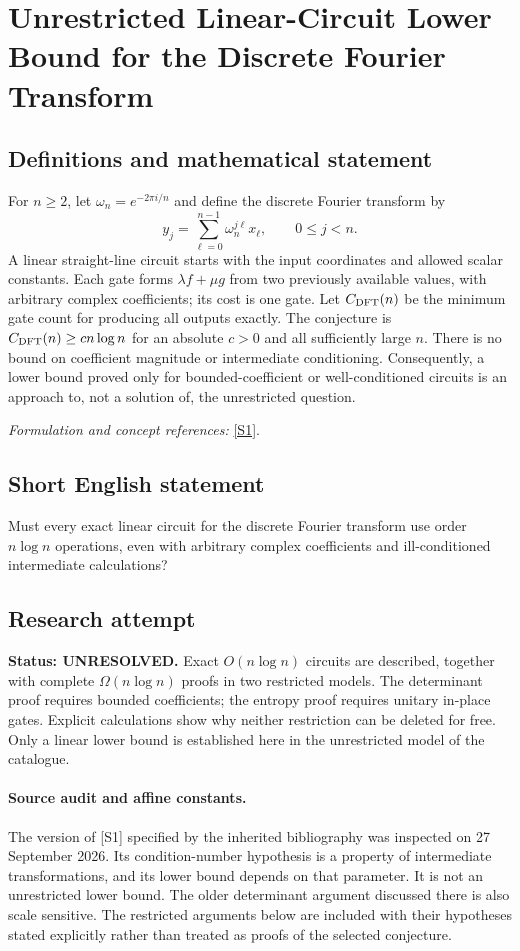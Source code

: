 \documentclass[11pt]{article}
\begin{document}
\section*{\texorpdfstring{Unrestricted Linear-Circuit Lower Bound for the Discrete Fourier Transform}{Unrestricted Linear-Circuit Lower Bound for the Discrete Fourier Transform}}\label{30006850}
\subsection{Definitions and mathematical statement}
For $n\ge2$, let $\omega_n=e^{-2\pi i/n}$ and define the discrete Fourier transform by
\[
 y_j=\sum_{\ell=0}^{n-1}\omega_n^{j\ell}x_\ell,
 \qquad0\le j<n.
\]
A linear straight-line circuit starts with the input coordinates and allowed scalar constants. Each gate forms $\lambda f+\mu g$ from two previously available values, with arbitrary complex coefficients; its cost is one gate. Let $C_{\rm DFT}(n)$ be the minimum gate count for producing all outputs exactly. The conjecture is $C_{\rm DFT}(n)\ge c n\log n$ for an absolute $c>0$ and all sufficiently large $n$. There is no bound on coefficient magnitude or intermediate conditioning. Consequently, a lower bound proved only for bounded-coefficient or well-conditioned circuits is an approach to, not a solution of, the unrestricted question.
\par\smallskip\textit{Formulation and concept references:} \href{https://arxiv.org/pdf/1403.1307v5}{[S1]}.

\subsection{Short English statement}
Must every exact linear circuit for the discrete Fourier transform use order $n\log n$ operations, even with arbitrary complex coefficients and ill-conditioned intermediate calculations?
\subsection{Research attempt}
\textbf{Status: UNRESOLVED.} Exact $O(n\log n)$ circuits are described, together with complete $\Omega(n\log n)$ proofs in two restricted models. The determinant proof requires bounded coefficients; the entropy proof requires unitary in-place gates. Explicit calculations show why neither restriction can be deleted for free. Only a linear lower bound is established here in the unrestricted model of the catalogue.

\paragraph{Source audit and affine constants.}
The version of [S1] specified by the inherited bibliography was inspected on 27 September 2026. Its condition-number hypothesis is a property of intermediate transformations, and its lower bound depends on that parameter. It is not an unrestricted lower bound. The older determinant argument discussed there is also scale sensitive. The restricted arguments below are included with their hypotheses stated explicitly rather than treated as proofs of the selected conjecture.
\end{document}
